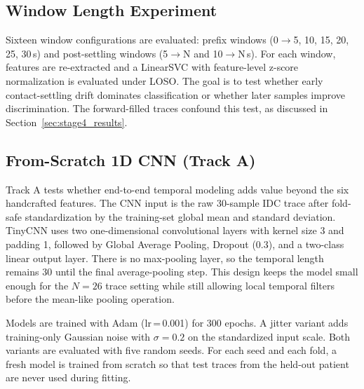 \documentclass[acmtog]{acmart}
\begin{document}
\subsection{Window Length Experiment}\label{sec:stage4}
Sixteen window configurations are evaluated: prefix windows
(0$\to$5, 10, 15, 20, 25, 30\,s) and post-settling windows
(5$\to$N and 10$\to$N\,s). For each window, features are re-extracted and a
LinearSVC with feature-level z-score normalization is evaluated under LOSO. The
goal is to test whether early contact-settling drift dominates classification
or whether later samples improve discrimination. The forward-filled traces
confound this test, as discussed in Section~\ref{sec:stage4_results}.

\subsection{From-Scratch 1D CNN (Track A)}\label{sec:cnn_a}
Track A tests whether end-to-end temporal modeling adds value beyond the six
handcrafted features. The CNN input is the raw 30-sample IDC trace after fold-safe
standardization by the training-set global mean and standard deviation. TinyCNN
uses two one-dimensional convolutional layers with kernel size 3 and padding 1,
followed by Global Average Pooling, Dropout (0.3), and a two-class linear output
layer. There is no max-pooling layer, so the temporal length remains 30 until the
final average-pooling step. This design keeps the model small enough for the
$N{=}26$ trace setting while still allowing local temporal filters before the
mean-like pooling operation.

Models are trained with Adam (lr\,=\,0.001) for 300 epochs. A jitter variant adds
training-only Gaussian noise with $\sigma=0.2$ on the standardized input scale.
Both variants are evaluated with five random seeds. For each seed and each fold,
a fresh model is trained from scratch so that test traces from the held-out
patient are never used during fitting.
\end{document}
